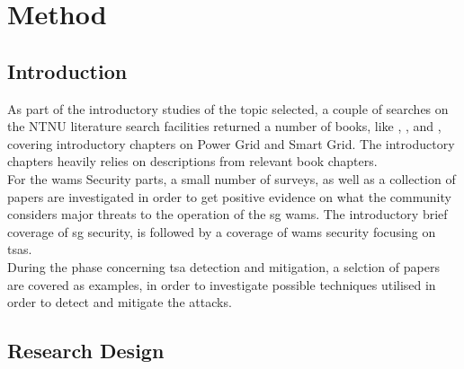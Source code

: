 \chapter{Method} 


\section{Introduction}

As part of the introductory studies of the topic selected, a couple of searches on the NTNU literature search facilities returned a number of books, like \cite{BlumeStevenW2007Epsb}, \cite{kabalci2019smart}, and \cite{momoh2012smart}, covering introductory chapters on Power Grid and Smart Grid. The introductory chapters heavily relies on descriptions from relevant book chapters. \\ 


For the \acrfull{wams} Security parts, a small number of surveys, as well as a collection of papers are investigated in order to get positive evidence on what the community considers major threats to the operation of the \acrshort{sg} \acrshort{wams}. The introductory brief coverage of \acrshort{sg} security, is followed by a coverage of \acrlong{wams} security focusing on \acrlong{tsa}s. \\ 


During the phase concerning \acrlong{tsa} detection and mitigation, a selction of papers are covered as examples, in order to investigate possible techniques utilised in order to detect and mitigate the attacks.  \\ 




\section{Research Design}

